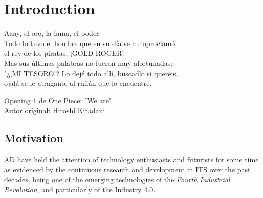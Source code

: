 % 
% 
% 
% 
% 
% 
% 

\chapter{Introduction}
\label{cha:introduction}

\begin{FraseCelebre}
  \begin{Frase}
    Aaay, el oro, la fama, el poder.  \\
    Todo lo tuvo el hombre que en su día se autoproclamó  \\
    el rey de los piratas, ¡GOLD ROGER!  \\
    Mas sus últimas palabras no fueron muy afortunadas:  \\
    "¿¡MI TESORO!? Lo dejé todo allí, buscadlo si queréis,  \\
    ojalá se le atragante al rufián que lo encuentre.
  \end{Frase}
  \begin{Fuente}
    Opening 1 de One Piece: "We are" \\
    Autor original: Hiroshi Kitadani
  \end{Fuente}
\end{FraseCelebre}

\section{Motivation}
\label{sec:1_motivation}

\ac{AD} have held the attention of technology enthusiasts and futurists for some time as evidenced by the continuous research and development in \ac{ITS} over the past decades, being one of the emerging technologies of the \textit{Fourth Industrial Revolution}, and particularly of the Industry 4.0. \\

